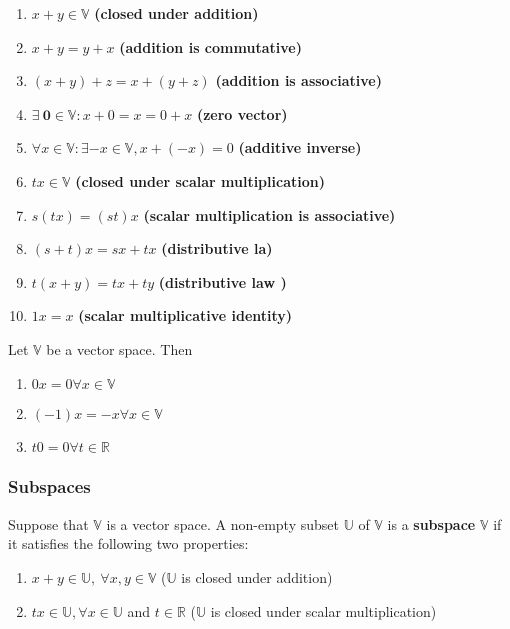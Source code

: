 \documentclass[a4paper,9pt]{extarticle}
\begin{document}
\begin{multicols*}{2}
\begin{enumerate}[label=\bfseries V(\arabic*)] \itemsep0pt \parskip0pt 
    \item $x + y \in \mathbb{V}$ \textbf{(closed under addition)}
    \item $x + y = y + x$ \textbf{(addition is commutative)}
    \item $(x + y) + z = x + (y + z)$ \textbf{(addition is associative)}
    \item $\exists \> \textbf{0} \in \mathbb{V}: x + 0 = x = 0 + x$ \textbf{(zero vector)}
    \item $\forall x \in \mathbb{V}: \exists -x \in \mathbb{V}, x + (-x) = 0$ \textbf{(additive inverse)}
    \item $t x \in \mathbb{V}$ \textbf{(closed under scalar multiplication)}
    \item $s(t x) = (st)x$ \textbf{(scalar multiplication is associative)}
    \item $(s + t)x = s x + t x$ \textbf{(distributive la)}
    \item $t(x + y) = t x + t y$ \textbf{(distributive law )}
    \item $1 x = x$ \textbf{(scalar multiplicative identity)}
\end{enumerate}

Let $\mathbb{V}$ be a vector space. Then
\begin{enumerate}[label=\bfseries (\arabic*)] \itemsep0pt \parskip0pt 
    \item $0 x = 0 \forall x \in \mathbb{V}$
    \item $(-1) x = -x \forall x \in \mathbb{V}$
    \item $t 0 = 0 \forall t \in \mathbb{R}$
\end{enumerate}


\subsubsection{Subspaces}
Suppose that $\mathbb{V}$ is a vector space. A non-empty subset $\mathbb{U}$ of $\mathbb{V}$ is a \textbf{subspace} $\mathbb{V}$ if it satisfies the following two properties:
\begin{enumerate}[label=\bfseries S(\arabic*)] \itemsep0pt \parskip0pt 
    \item $x + y \in \mathbb{U}, \> \forall x, y \in \mathbb{V}$ ($\mathbb{U}$ is closed under addition)
    \item $t x \in \mathbb{U}, \forall x \in \mathbb{U}$ and $t \in \mathbb{R}$ ($\mathbb{U}$ is closed under scalar multiplication)
\end{enumerate}


\end{multicols*}
\end{document}
